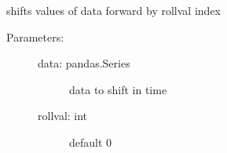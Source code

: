 \documentclass[letterpaper,10pt,english]{sphinxmanual}
\begin{document}

\begin{fulllineitems}
\label{\detokenize{code:ATom.atom_functions.rollchannel}}
shifts values of data forward by rollval index
\begin{description}
\item[{Parameters:}] \leavevmode\begin{description}
\item[{data: pandas.Series}] \leavevmode
data to shift in time

\item[{rollval: int}] \leavevmode
default 0

\end{description}

\end{description}

\end{fulllineitems}

\end{document}
